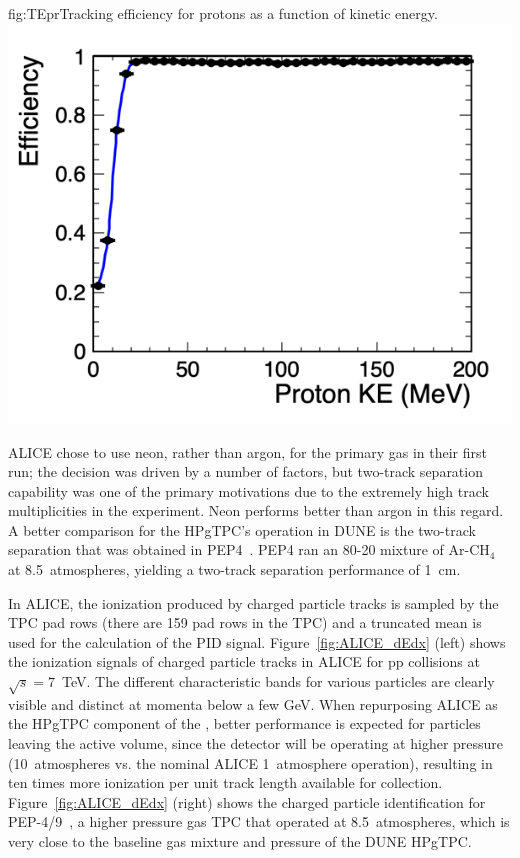 \begin{dunefigure}{fig:TEpr}{Tracking efficiency for protons as a function of kinetic energy.} 
\includegraphics[width=0.65\columnwidth]{graphics/effvske.png} 
\end{dunefigure}

ALICE chose to use neon, rather than argon, for the primary gas in their first run; the decision was driven by a number of factors, but two-track separation capability was one of the primary motivations due to the extremely high track multiplicities in the experiment.  Neon performs better than argon in this regard.  A better comparison for the HPgTPC's operation in DUNE is the two-track separation that was obtained in PEP4~\cite{PEP4_Stork}.  PEP4 ran an 80-20 mixture of Ar-CH$_4$ at 8.5~atmospheres, yielding a two-track separation performance of \SI{1}{cm}.

In ALICE, the ionization produced by charged particle tracks is sampled by the TPC pad rows (there are 159 pad rows in the TPC) and a truncated mean is used for the calculation of the PID signal. Figure~\ref{fig:ALICE_dEdx} (left) shows the ionization signals of charged particle tracks in ALICE for pp collisions at $\sqrt{s} = 7$~TeV. The different characteristic bands for various particles are clearly visible and distinct at momenta below a few GeV.  When repurposing ALICE as the HPgTPC component of the ,  better performance is expected for particles leaving the active volume, since the detector will be operating at higher pressure (10~atmospheres vs. the nominal ALICE 1~atmosphere operation), resulting in ten times more ionization per unit track length available for collection. Figure~\ref{fig:ALICE_dEdx} (right) shows the charged particle identification for PEP-4/9~\cite{Grupen:1999by}, a higher pressure gas TPC that operated at 8.5~atmospheres, which is very close to the baseline gas mixture and pressure of the DUNE HPgTPC.

